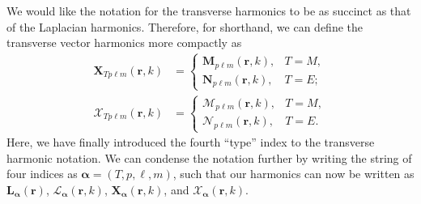 \documentclass{article}
\begin{document}
We would like the notation for the transverse harmonics to be as succinct as that of the Laplacian harmonics. Therefore, for shorthand, we can define the transverse vector harmonics more compactly as
\begin{equation}
\begin{split}
\mathbf{X}_{Tp\ell m}(\mathbf{r},k) &= 
\begin{cases}
\mathbf{M}_{p\ell m}(\mathbf{r},k), & T=M,\\
\mathbf{N}_{p\ell m}(\mathbf{r},k), & T=E;
\end{cases}\\[1.0em]
\bm{\mathcal{X}}_{Tp\ell m}(\mathbf{r},k) &=
\begin{cases}
\bm{\mathcal{M}}_{p\ell m}(\mathbf{r},k), & T=M,\\
\bm{\mathcal{N}}_{p\ell m}(\mathbf{r},k), & T=E.
\end{cases}
\end{split}
\end{equation}
Here, we have finally introduced the fourth ``type'' index to the transverse harmonic notation. We can condense the notation further by writing the string of four indices as $\bm{\alpha} = (T,p,\ell,m)$, such that our harmonics can now be written as $\mathbf{L}_{\bm{\alpha}}(\mathbf{r})$, $\bm{\mathcal{L}}_{\bm{\alpha}}(\mathbf{r},k)$, $\mathbf{X}_{\bm{\alpha}}(\mathbf{r},k)$, and $\bm{\mathcal{X}}_{\bm{\alpha}}(\mathbf{r},k)$.
\end{document}
